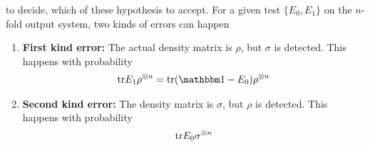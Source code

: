 to decide, which of these hypothesis to accept. For a given test $\{E_0,E_1\}$ on the $n$-fold output system, two kinds of errors can happen 
\begin{enumerate}
	\item \textbf{First kind error:} The actual density matrix is $\rho$, but $\sigma$ is detected. This happens with probability 
	\begin{align*}
	\tr E_1 \rho^{\otimes n} = \tr (\bbmeins - E_0) \rho^{\otimes n}
	\end{align*}
	\item \textbf{Second kind error:} The density matrix is $\sigma$, but $\rho$ is detected. This happens with probability 
	\begin{align*}
	\mathrm{tr} E_0 \sigma^{\otimes n}
	\end{align*}
\end{enumerate}
